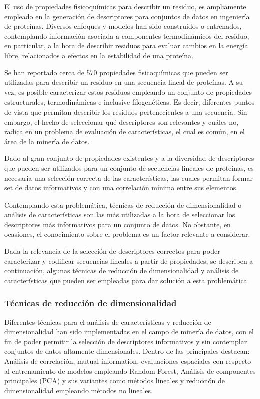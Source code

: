 El uso de propiedades fisicoquímicas para describir un residuo, es ampliamente empleado en la generación de descriptores para conjuntos de datos en ingeniería de proteínas. Diversos enfoques y modelos han sido construidos o entrenados, contemplando información asociada a componentes termodinámicos del residuo, en particular, a la hora de describir residuos para evaluar cambios en la energía libre, relacionados a efectos en la estabilidad de una proteína.

Se han reportado cerca de 570 propiedades fisicoquímicas que pueden ser utilizadas para describir un residuo en una secuencia lineal de proteínas. A su vez, es posible caracterizar estos residuos empleando un conjunto de propiedades estructurales, termodinámicas e inclusive filogenéticas. Es decir, diferentes puntos de vista que permitan describir los residuos pertenecientes a una secuencia. Sin embargo, el hecho de seleccionar qué descriptores son relevantes y cuáles no, radica en un problema de evaluación de características, el cual es común, en el área de la minería de datos. 

Dado al gran conjunto de propiedades existentes y a la diversidad de descriptores que pueden ser utilizados para un conjunto de secuencias lineales de proteínas, es necesaria una selección correcta de las características, las cuales permitan formar set de datos informativos y con una correlación mínima entre sus elementos. 

Contemplando esta problemática, técnicas de reducción de dimensionalidad o análisis de características son las más utilizadas a la hora de seleccionar los descriptores más informativos para un conjunto de datos. No obstante, en ocasiones, el conocimiento sobre el problema es un factor relevante a considerar. 

Dada la relevancia de la selección de descriptores correctos para poder caracterizar y codificar secuencias lineales a partir de propiedades, se describen a continuación, algunas técnicas de reducción de dimensionalidad y análisis de características que pueden ser empleadas para dar solución a esta problemática.

\subsubsection{Técnicas de reducción de dimensionalidad}

Diferentes técnicas para el análisis de características y reducción de dimensionalidad han sido implementadas en el campo de minería de datos, con el fin de poder permitir la selección de descriptores informativos y sin contemplar conjuntos de datos altamente dimensionales. Dentro de las principales destacan: Análisis de correlación, mutual information, evaluaciones espaciales con respecto al entrenamiento de modelos empleando Random Forest, Análisis de componentes principales (PCA) y sus variantes como métodos lineales y reducción de dimensionalidad empleando métodos no lineales. 

